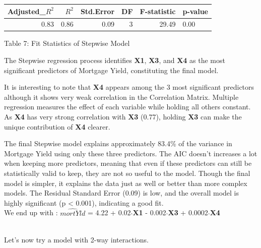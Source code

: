 \documentclass[
  12pt,
]{article}
\begin{document}
\addtocounter{table}{2}

\begin{table}[!h]
\centering\begingroup\fontsize{8}{10}\selectfont

\begin{tabular}{rrrrrl}
\toprule
Adjusted\_$R^{2}$ & $R^2$ & Std.Error & DF & F-statistic & p-value\\
\midrule
0.83 & 0.86 & 0.09 & 3 & 29.49 & 0.00\\
\bottomrule
\end{tabular}
\endgroup{}
\end{table}
\begin{center}
\vspace{-1.5em}
{\fontsize{12}{14}\selectfont Table 7: Fit Statistics of Stepwise Model\par}
\end{center}

The Stepwise regression process identifies \textbf{X1}, \textbf{X3}, and
\textbf{X4} as the most significant predictors of Mortgage Yield,
constituting the final model.

It is interesting to note that \textbf{X4} appears among the 3 most
significant predictors although it shows very weak correlation in the
Correlation Matrix. Multiple regression measures the effect of each
variable while holding all others constant. As \textbf{X4} has very
strong correlation with \textbf{X3} (0.77), holding \textbf{X3} can make
the unique contribution of \textbf{X4} clearer.

The final Stepwise model explains approximately 83.4\% of the variance
in Mortgage Yield using only these three predictors. The AIC doesn't
increases a lot when keeping more predictors, meaning that even if these
predictors can still be statistically valid to keep, they are not so
useful to the model. Though the final model is simpler, it explains the
data just as well or better than more complex models. The Residual
Standard Error (0.09) is low, and the overall model is highly
significant (p \textless{} 0.001), indicating a good fit.\\
We end up with : \(\hat{mortYld}\) = 4.22 + 0.02\(\cdot\)\textbf{X1} -
0.002\(\cdot\)\textbf{X3} + 0.0002\(\cdot\)\textbf{X4}\\
\strut \\
Let's now try a model with 2-way interactions.
\end{document}
